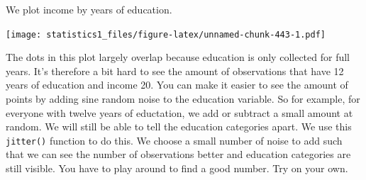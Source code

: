 \documentclass[]{article}
\newenvironment{Shaded}{\begin{snugshade}}{\end{snugshade}}
\newcommand{\KeywordTok}[1]{\textcolor[rgb]{0.13,0.29,0.53}{\textbf{#1}}}
\newcommand{\DataTypeTok}[1]{\textcolor[rgb]{0.13,0.29,0.53}{#1}}
\newcommand{\DecValTok}[1]{\textcolor[rgb]{0.00,0.00,0.81}{#1}}
\newcommand{\FloatTok}[1]{\textcolor[rgb]{0.00,0.00,0.81}{#1}}
\newcommand{\StringTok}[1]{\textcolor[rgb]{0.31,0.60,0.02}{#1}}
\newcommand{\OperatorTok}[1]{\textcolor[rgb]{0.81,0.36,0.00}{\textbf{#1}}}
\newcommand{\NormalTok}[1]{#1}
\theoremstyle{definition}
\theoremstyle{definition}
\theoremstyle{definition}
\theoremstyle{remark}
\begin{document}
We plot income by years of education.

\begin{Shaded}
\end{Shaded}

\texttt{[image: statistics1\_files/figure-latex/unnamed-chunk-443-1.pdf]}

The dots in this plot largely overlap because education is only
collected for full years. It's therefore a bit hard to see the amount of
observations that have 12 years of education and income 20. You can make
it easier to see the amount of points by adding sine random noise to the
education variable. So for example, for everyone with twelve years of
eductation, we add or subtract a small amount at random. We will still
be able to tell the education categories apart. We use this
\texttt{jitter()} function to do this. We choose a small number of noise
to add such that we can see the number of observations better and
education categories are still visible. You have to play around to find
a good number. Try on your own.

\begin{Shaded}
\end{Shaded}
\end{document}
